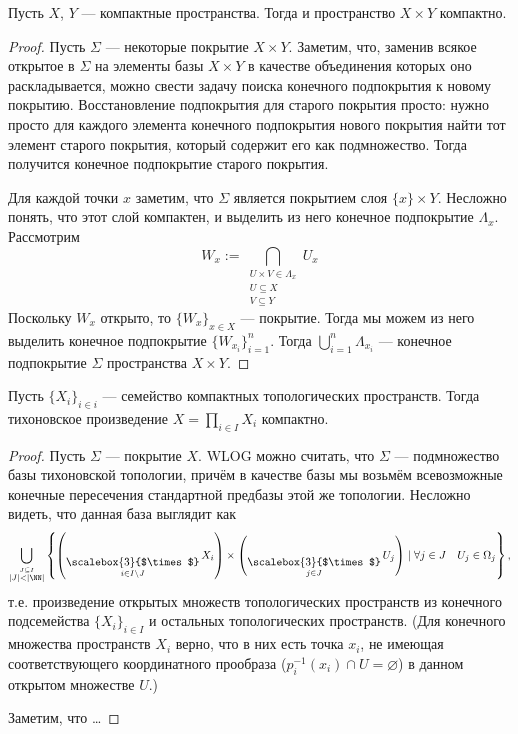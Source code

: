 \documentclass[12pt,a4paper]{article}
\DeclareMathOperator*{\bigtimes}{\text{\raisebox{-6pt}{\scalebox{3}{$\times$}}}}
\begin{document}
    \begin{theorem}
        Пусть $X$, $Y$ --- компактные пространства. Тогда и пространство $X \times Y$ компактно.
    \end{theorem}

    \begin{proof}
        Пусть $\Sigma$ --- некоторые покрытие $X \times Y$. Заметим, что, заменив всякое открытое в $\Sigma$ на элементы базы $X \times Y$ в качестве объединения которых оно раскладывается, можно свести задачу поиска конечного подпокрытия к новому покрытию. Восстановление подпокрытия для старого покрытия просто: нужно просто для каждого элемента конечного подпокрытия нового покрытия найти тот элемент старого покрытия, который содержит его как подмножество. Тогда получится конечное подпокрытие старого покрытия.

        Для каждой точки $x$ заметим, что $\Sigma$ является покрытием слоя $\{x\} \times Y$. Несложно понять, что этот слой компактен, и выделить из него конечное подпокрытие $\Lambda_x$. Рассмотрим
        \[W_x := \bigcap_{\substack{U \times V \in \Lambda_x\\U \subseteq X\\V \subseteq Y}} U_x\]
        Поскольку $W_x$ открыто, то $\{W_x\}_{x \in X}$ --- покрытие. Тогда мы можем из него выделить конечное подпокрытие $\{W_{x_i}\}_{i = 1}^n$. Тогда $\bigcup_{i=1}^n \Lambda_{x_i}$ --- конечное подпокрытие $\Sigma$ пространства $X \times Y$.
    \end{proof}

    \begin{theorem}[Тихонова]
        Пусть $\{X_i\}_{i \in i}$ --- семейство компактных топологических пространств. Тогда тихоновское произведение $X = \prod_{i \in I} X_i$ компактно.
    \end{theorem}

    \begin{proof}
        Пусть $\Sigma$ --- покрытие $X$. WLOG можно считать, что $\Sigma$ --- подмножество базы тихоновской топологии, причём в качестве базы мы возьмём всевозможные конечные пересечения стандартной предбазы этой же топологии. Несложно видеть, что данная база выглядит как
        \[\bigcup_{\stackrel{J \subseteq I}{|J| < |\NN|}} \left\{\left(\bigtimes_{i \in I \setminus J} X_i\right) \times \left(\bigtimes_{j \in J} U_j\right) \mid \forall j \in J\quad U_j \in \Omega_j\right\},\]
        т.е. произведение открытых множеств топологических пространств из конечного подсемейства $\{X_i\}_{i \in I}$ и остальных топологических пространств. (Для конечного множества пространств $X_i$ верно, что в них есть точка $x_i$, не имеющая соответствующего координатного прообраза ($p_i^{-1}(x_i) \cap U = \varnothing$) в данном открытом множестве $U$.)

        Заметим, что \dots
    \end{proof}
\end{document}
